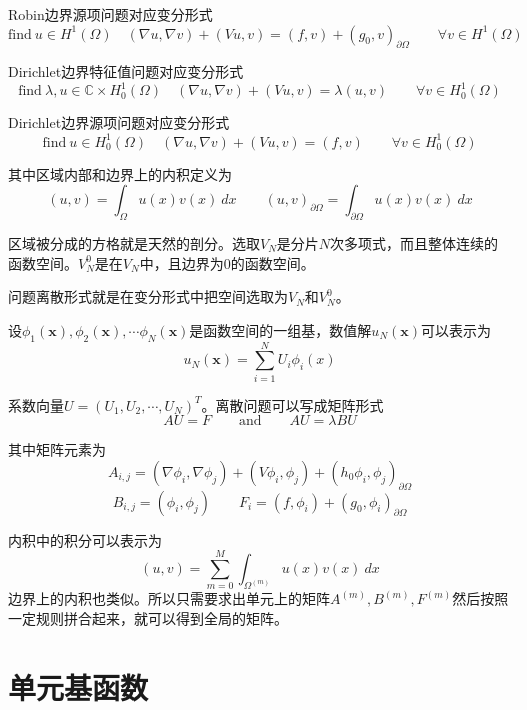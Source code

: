 \documentclass[UTF8,12pt]{article}
\begin{document}
Robin边界源项问题对应变分形式
\begin{equation}
\text{find} \ u \in H^1(\Omega) \quad (\nabla u, \nabla v) + (V u, v) = (f, v) + (g_0, v)_{\partial\Omega} \qquad \forall v \in  H^1(\Omega)
\end{equation}

Dirichlet边界特征值问题对应变分形式
\begin{equation}
\text{find} \ \lambda, u \in \mathbb{C} \times H_0^1(\Omega) \quad (\nabla u, \nabla v) + (V u, v) = \lambda (u, v) \qquad \forall v \in  H_0^1(\Omega)
\end{equation}

Dirichlet边界源项问题对应变分形式
\begin{equation}
\text{find} \ u \in H_0^1(\Omega) \quad (\nabla u, \nabla v) + (V u, v) = (f, v) \qquad \forall v \in  H_0^1(\Omega)
\end{equation}

其中区域内部和边界上的内积定义为
$$ (u, v) = \int_\Omega u(x) v(x) \ dx \qquad (u, v)_{\partial\Omega} = \int_{\partial\Omega} u(x) v(x) \ dx $$

区域被分成的方格就是天然的剖分。选取$V_N$是分片$N$次多项式，而且整体连续的函数空间。$V_N^0$是在$V_N$中，且边界为0的函数空间。

问题离散形式就是在变分形式中把空间选取为$V_N$和$V_N^0$。

设$\phi_1(\mathbf{x}), \phi_2(\mathbf{x}), \cdots \phi_N(\mathbf{x})$是函数空间的一组基，数值解$u_N(\mathbf{x})$可以表示为
$$ u_N(\mathbf{x}) = \sum_{i=1}^{N} U_i \phi_{i}(x) $$

系数向量$U = (U_1, U_2, \cdots, U_N)^T$。离散问题可以写成矩阵形式
\begin{equation}
A U = F \qquad \text{and} \qquad A U = \lambda B U
\end{equation}

其中矩阵元素为
$$ A_{i,j} = (\nabla \phi_i, \nabla \phi_j) + (V \phi_i, \phi_j) + (h_0 \phi_i, \phi_j)_{\partial\Omega} $$
$$ B_{i,j} = (\phi_i, \phi_j) \qquad F_i = (f, \phi_i) + (g_0, \phi_i)_{\partial\Omega} $$

内积中的积分可以表示为
$$ (u, v) = \sum_{m=0}^{M} \int_{\Omega^{(m)}} u(x) v(x) \ dx $$
边界上的内积也类似。所以只需要求出单元上的矩阵$A^{(m)},B^{(m)},F^{(m)}$然后按照一定规则拼合起来，就可以得到全局的矩阵。

\section{单元基函数}
\end{document}
